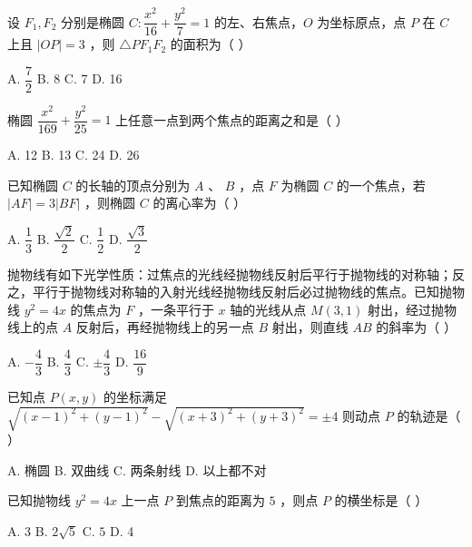 \documentclass[11pt, a4paper]{article}
\begin{document}
\begin{baitap}[9]
设 $F_1, F_2$ 分别是椭圆 $C: \dfrac{x^2}{16} + \dfrac{y^2}{7} = 1$ 的左、右焦点，$O$ 为坐标原点，点 $P$ 在 $C$ 上且 $|OP| = 3$ ，则 $\triangle PF_1F_2$ 的面积为（ ）
\par\vspace{3pt}
\noindent A. $\dfrac{7}{2}$ \quad B. 8 \quad C. 7 \quad D. 16
\end{baitap}

\begin{baitap}[10]
椭圆 $\dfrac{x^2}{169} + \dfrac{y^2}{25} = 1$ 上任意一点到两个焦点的距离之和是（ ）
\par\vspace{3pt}
\noindent A. 12 \quad B. 13 \quad C. 24 \quad D. 26
\end{baitap}

\begin{baitap}[11]
已知椭圆 $C$ 的长轴的顶点分别为 $A$ 、 $B$ ，点 $F$ 为椭圆 $C$ 的一个焦点，若 $|AF| = 3|BF|$ ，则椭圆 $C$ 的离心率为（ ）
\par\vspace{3pt}
\noindent A. $\dfrac{1}{3}$ \quad B. $\dfrac{\sqrt{2}}{2}$ \quad C. $\dfrac{1}{2}$ \quad D. $\dfrac{\sqrt{3}}{2}$
\end{baitap}

\begin{baitap}[12]
抛物线有如下光学性质：过焦点的光线经抛物线反射后平行于抛物线的对称轴；反之，平行于抛物线对称轴的入射光线经抛物线反射后必过抛物线的焦点。已知抛物线 $y^2 = 4x$ 的焦点为 $F$ ，一条平行于 $x$ 轴的光线从点 $M(3,1)$ 射出，经过抛物线上的点 $A$ 反射后，再经抛物线上的另一点 $B$ 射出，则直线 $AB$ 的斜率为（ ）
\par\vspace{3pt}
\noindent A. $-\dfrac{4}{3}$ \quad B. $\dfrac{4}{3}$ \quad C. $\pm\dfrac{4}{3}$ \quad D. $\dfrac{16}{9}$
\end{baitap}

\begin{baitap}[13]
已知点 $P(x, y)$ 的坐标满足 $\sqrt{(x-1)^2 + (y-1)^2} - \sqrt{(x+3)^2 + (y+3)^2} = \pm 4$ 则动点 $P$ 的轨迹是（ ）
\par\vspace{3pt}
\noindent A. 椭圆 \quad B. 双曲线 \quad C. 两条射线 \quad D. 以上都不对
\end{baitap}

\begin{baitap}[14]
已知抛物线 $y^2 = 4x$ 上一点 $P$ 到焦点的距离为 $5$ ，则点 $P$ 的横坐标是（ ）
\par\vspace{3pt}
\noindent A. 3 \quad B. $2\sqrt{5}$ \quad C. $5$ \quad D. 4
\end{baitap}
\end{document}
